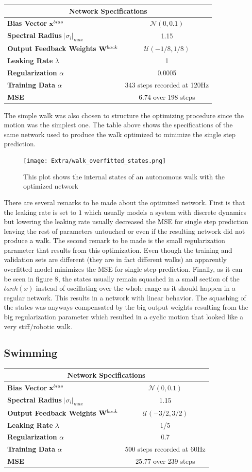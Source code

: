 \documentclass[letterpaper,9pt]{article}
\newcommand{\networkSpecs}[7]{
  \begin{center}
  \begin{tabular}{ | l | c | }
    \hline
    \multicolumn{2}{|c|}{{\bf Network Specifications}} \\
    \hline
    {\bf Bias Vector} ${\bf x}^{bias}$ & $\mathcal{N}(#1)$ \\
    \hline
    {\bf Spectral Radius} $|\sigma_i|_{max}$ & #2 \\
    \hline
    {\bf Output Feedback Weights} ${\bf W}^{back}$ & $\mathcal{U}(#3)$ \\
    \hline
    {\bf Leaking Rate} $\lambda$ & #4 \\
    \hline
    {\bf Regularization} $\alpha$ & #5\\
    \hline
    {\bf Training Data} $\alpha$ & #6\\
    \hline
    {\bf MSE} & #7\\
    \hline
  \end{tabular}    
  \end{center}
}
\begin{document}
\networkSpecs{0,0.1}
             {1.15}
             {-1/8,1/8}
             {1}
             {0.0005}
             {343 steps recorded at 120Hz}
             {6.74 over 198 steps}

The simple walk was also chosen to structure the optimizing procedure since the motion was the simplest one. The table above shows the specifications of the same network used to produce the walk optimized to minimize the single step prediction. 

\begin{figure}[h!]
  \centering
  \texttt{[image: Extra/walk\_overfitted\_states.png]}
  \caption[Simple Walk Optimized States]{This plot shows the internal states of an autonomous walk with the optimized network}
\end{figure}

There are several remarks to be made about the optimized network. First is that the leaking rate is set to $1$ which usually models a system with discrete dynamics but lowering the leaking rate usually decreased the MSE for single step prediction leaving the rest of parameters untouched or even if the resulting network did not produce a walk. The second remark to be made is the small regularization parameter that results from this optimization. Even though the training and validation sets are different (they are in fact different walks) an apparently overfitted model minimizes the MSE for single step prediction. Finally, as it can be seen in figure 8, the states usually remain squashed in a small section of the $tanh(x)$ instead of oscillating over the whole range as it should happen in a regular network. This results in a network with linear behavior. The squashing of the states was anyways compensated by the big output weights resulting from the big regularization parameter which resulted in a cyclic motion that looked like a very stiff/robotic walk.

\subsection{Swimming}

\networkSpecs{0,0.1}
             {1.15}
             {-3/2,3/2}
             {1/5}
             {0.7}
             {500 steps recorded at 60Hz}
             {25.77 over 239 steps}
\end{document}
